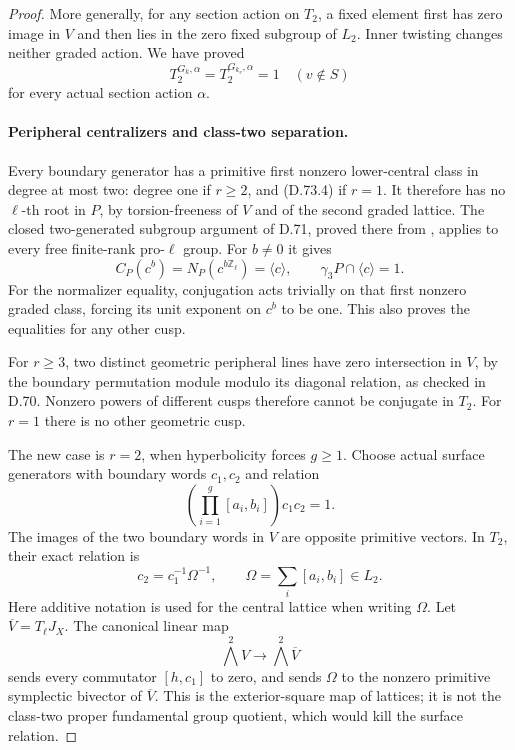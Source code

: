 \begin{proof}
More generally, for any section action
on \(T_2\), a fixed element first has
zero image in \(V\) and then lies in
the zero fixed subgroup of \(L_2\).
Inner twisting changes neither graded
action. We have proved
\[
               T_2^{G_k,\alpha}
                 =T_2^{G_{k_v},\alpha}=1
                              \quad(v\notin S)         \tag{D.73.5}
\]
for every actual section action \(\alpha\).

\paragraph{Peripheral centralizers and class-two separation.}
Every boundary generator has a primitive
first nonzero lower-central class in degree
at most two: degree one if \(r\ge2\), and
(D.73.4) if \(r=1\). It therefore has no
\(\ell\)-th root in \(P\), by torsion-freeness
of \(V\) and of the second graded lattice.
The closed two-generated subgroup argument
of D.71, proved there from
\cite[Theorem 3.2]{DE_Lubotzky1982}, applies
to every free finite-rank pro-\(\ell\) group.
For \(b\ne0\) it gives
\[
       C_P(c^b)=N_P(c^{b\mathbb Z_\ell})
                 =\langle c\rangle,\qquad
       \gamma_3P\cap\langle c\rangle=1.                \tag{D.73.6}
\]
For the normalizer equality, conjugation
acts trivially on that first nonzero
graded class, forcing its unit exponent
on \(c^b\) to be one. This also proves
the equalities for any other cusp.

For \(r\ge3\), two distinct geometric
peripheral lines have zero intersection
in \(V\), by the boundary permutation
module modulo its diagonal relation,
as checked in D.70. Nonzero powers of
different cusps therefore cannot be
conjugate in \(T_2\). For \(r=1\) there
is no other geometric cusp.

The new case is \(r=2\), when hyperbolicity
forces \(g\ge1\). Choose actual surface
generators with boundary words \(c_1,c_2\)
and relation
\[
          \left(\prod_{i=1}^g[a_i,b_i]\right)c_1c_2=1.
                                                        \tag{D.73.7}
\]
The images of the two boundary words
in \(V\) are opposite primitive vectors.
In \(T_2\), their exact relation is
\[
                    c_2=c_1^{-1}\Omega^{-1},
       \qquad\Omega=\sum_i[a_i,b_i]\in L_2.            \tag{D.73.8}
\]
Here additive notation is used for the
central lattice when writing \(\Omega\).
Let \(\overline V=T_\ell J_X\).
The canonical linear map
\[
              \bigwedge^2V\longrightarrow
                              \bigwedge^2\overline V  \tag{D.73.9}
\]
sends every commutator \([h,c_1]\) to
zero, and sends \(\Omega\) to the
nonzero primitive symplectic bivector
of \(\overline V\). This is the
exterior-square map of lattices; it
is not the class-two proper fundamental
group quotient, which would kill the
surface relation.


\end{proof}
